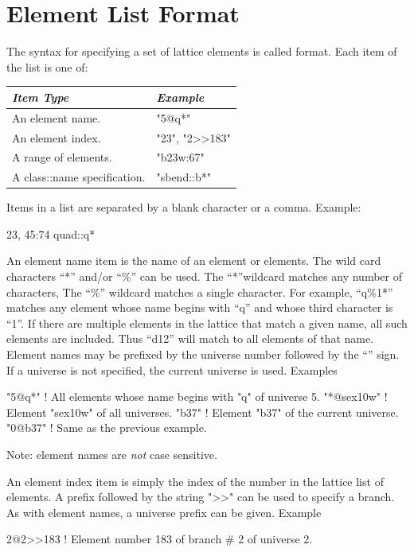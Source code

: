 \section{Element List Format}
\label{s:ele.list.format}

The syntax for specifying a set of lattice elements is called
 format. Each item of the list is one of:
\begin{center}
\begin{tabular}{ll}
  {\it Item Type} & {\it Example} \\ \hline     
  An element name.                                & "5@q*"               \\
  An element index.                               & "23", "2>>183"       \\
  A range of elements.                            & "b23w:67"            \\
  A class::name specification.                    & "sbend::b*"          \\
\end{tabular}
\break

\end{center}
Items in a list are separated by a blank character or a comma. Example:
\begin{example}
  23, 45:74 quad::q*
\end{example}

An element name item is the name of an element or elements. The
wild card characters ``*'' and/or ``\%'' can be used. The ``*''wildcard
matches any number of characters, The ``\%'' wildcard matches a single
character. For example, ``q\%1*'' matches any element whose name
begins with ``q'' and whose third character is ``1''.  If there are
multiple elements in the lattice that match a given name, all such
elements are included. Thus ``d12'' will match to all elements of that
name. Element names may be prefixed by the universe number followed by
the ``\vn{\@}'' sign. If a universe is not specified, the current universe
is used. Examples
\begin{example}
  "5@q*"       ! All elements whose name begins with "q" of universe 5.
  "*@sex10w"   ! Element "sex10w" of all universes.
  "b37"        ! Element "b37" of the current universe.
  "0@b37"      ! Same as the previous example.
\end{example}
Note: element names are {\em not} case sensitive.

An element index item is simply the index of the number in the lattice
list of elements. A prefix followed by the string ">>" can be used to
specify a branch. As with element names, a universe prefix can be 
given. Example
\begin{example}
  2@2>>183   ! Element number 183 of branch \# 2 of universe 2.
\end{example}

